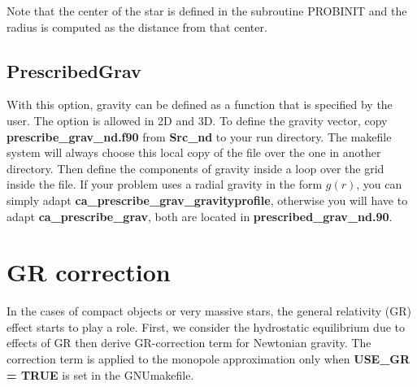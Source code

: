 \begin{itemize}
Note that the center of the star is defined in the subroutine PROBINIT and the radius
is computed as the distance from that center.

\subsection{PrescribedGrav}


With this option, gravity can be defined as a function that
is specified by the user.  The option is allowed in 2D and 3D.  To define the gravity
vector, copy {\bf prescribe\_grav\_nd.f90} from {\bf Src\_nd} to your run directory.
The makefile system will always choose this local copy of the file over the one in another directory.
Then define the components of gravity inside a loop over the grid inside the file.
If your problem uses a radial gravity in the form $g(r)$, you can simply adapt 
{\bf ca\_prescribe\_grav\_gravityprofile}, otherwise you will have to adapt 
{\bf ca\_prescribe\_grav}, both are located in {\bf prescribed\_grav\_nd.90}.
\end{itemize}

\section{GR correction}


In the cases of compact objects or very massive stars, the general relativity 
(GR) effect starts to play a role. First, we consider the hydrostatic equilibrium 
due to effects of GR then derive GR-correction term for Newtonian gravity. 
The correction term is applied to the monopole approximation only when 
{\bf USE\_GR  = TRUE} is set in the GNUmakefile. 

